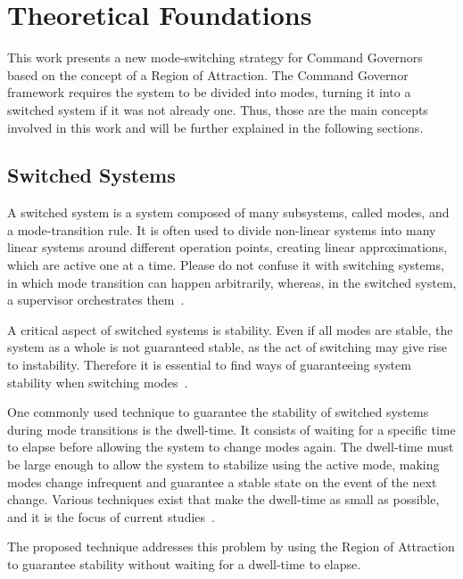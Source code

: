 
\chapter{Theoretical Foundations}%
\label{chp:theoretical-foundations}

This work presents a new mode-switching strategy for Command Governors based on
the concept of a Region of Attraction. The Command Governor framework requires
the system to be divided into modes, turning it into a switched system if it was
not already one. Thus, those are the main concepts involved in this work and
will be further explained in the following sections.

\section{Switched Systems}%
\label{sec:switched-systems}

A switched system is a system composed of many subsystems, called modes, and a
mode-transition rule. It is often used to divide non-linear systems into many
linear systems around different operation points, creating linear
approximations, which are active one at a time. Please do not confuse it with
switching systems, in which mode transition can happen arbitrarily, whereas, in
the switched system, a supervisor orchestrates them~\cite{Morse99,Lucia2017}.

A critical aspect of switched systems is stability. Even if all modes are
stable, the system as a whole is not guaranteed stable, as the act of switching
may give rise to instability. Therefore it is essential to find ways of
guaranteeing system stability when switching modes~\cite{Lin2009}.

One commonly used technique to guarantee the stability of switched systems
during mode transitions is the dwell-time. It consists of waiting for a specific
time to elapse before allowing the system to change modes again. The dwell-time
must be large enough to allow the system to stabilize using the active mode,
making modes change infrequent and guarantee a stable state on the event of the
next change. Various techniques exist that make the dwell-time as small as
possible, and it is the focus of current studies~\cite{Franze2017,Chesi2010}.

The proposed technique addresses this problem by using the Region of Attraction
to guarantee stability without waiting for a dwell-time to elapse.

